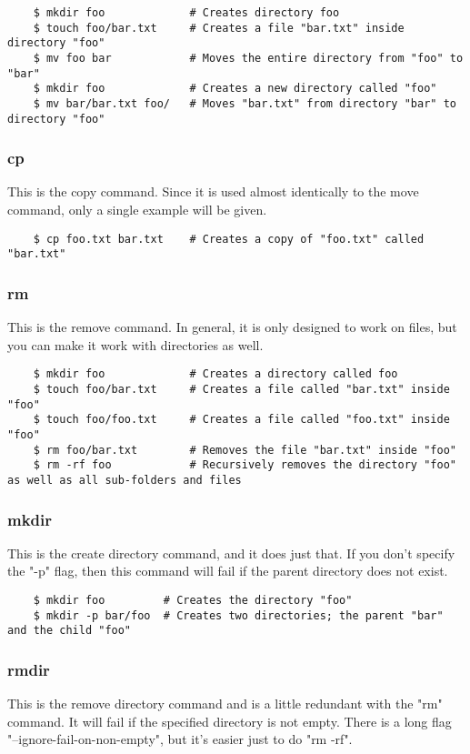 	\begin{verbatim}
	$ mkdir foo				# Creates directory foo
	$ touch foo/bar.txt		# Creates a file "bar.txt" inside directory "foo"
	$ mv foo bar			# Moves the entire directory from "foo" to "bar"
	$ mkdir foo				# Creates a new directory called "foo"
	$ mv bar/bar.txt foo/	# Moves "bar.txt" from directory "bar" to directory "foo"
	\end{verbatim}


\subsubsection{cp} \mdseries
This is the copy command.  Since it is used almost identically to the move command, only a single example will be given.

	\begin{verbatim}
	$ cp foo.txt bar.txt	# Creates a copy of "foo.txt" called "bar.txt"
	\end{verbatim}

\subsubsection{rm} \mdseries
This is the remove command.  In general, it is only designed to work on files, but you can make it work with directories as well.

	\begin{verbatim}
	$ mkdir foo				# Creates a directory called foo
	$ touch foo/bar.txt		# Creates a file called "bar.txt" inside "foo"
	$ touch foo/foo.txt		# Creates a file called "foo.txt" inside "foo"
	$ rm foo/bar.txt		# Removes the file "bar.txt" inside "foo"
	$ rm -rf foo			# Recursively removes the directory "foo" as well as all sub-folders and files
	\end{verbatim}


\subsubsection{mkdir} \mdseries
This is the create directory command, and it does just that.  If you don't specify the "-p" flag, then this command will fail if the parent directory does not exist.

	\begin{verbatim}
	$ mkdir foo			# Creates the directory "foo"
	$ mkdir -p bar/foo	# Creates two directories; the parent "bar" and the child "foo"
	\end{verbatim}


\subsubsection{rmdir} \mdseries
This is the remove directory command and is a little redundant with the "rm" command.  It will fail if the specified directory is not empty.  There is a long flag "--ignore-fail-on-non-empty", but it's easier just to do "rm -rf".

